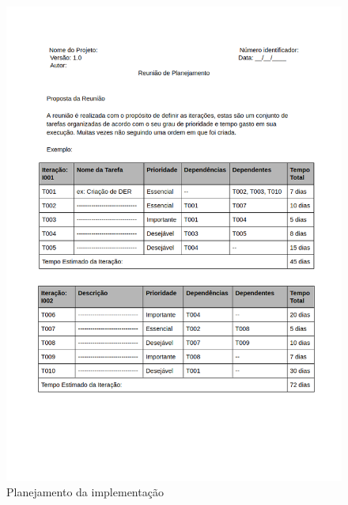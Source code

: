 \documentclass[	DIV=calc,%
							paper=a4,%
							fontsize=12pt,%
							onecolumn]{scrartcl}	 					%
\begin{document}
\begin{figure}
	\centering
	\includegraphics[width=\textwidth]{4-1.png}
	\caption{Planejamento da implementação}
	\label{Figura 4}
\end{figure}
\end{document}

